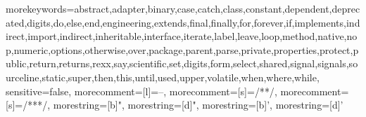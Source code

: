 {morekeywords={abstract,adapter,binary,case,catch,class,constant,dependent,deprecated,digits,do,else,end,engineering,extends,final,finally,for,forever,if,implements,indirect,import,indirect,inheritable,interface,iterate,label,leave,loop,method,native,nop,numeric,options,otherwise,over,package,parent,parse,private,properties,protect,public,return,returns,rexx,say,scientific,set,digits,form,select,shared,signal,signals,sourceline,static,super,then,this,until,used,upper,volatile,when,where,while},
sensitive=false,
morecomment=[l]={--},
morecomment=[s]={/*}{*/},
morecomment=[s]={/**}{*/},
morestring=[b]",
morestring=[d]",
morestring=[b]',
morestring=[d]'}

\lstset{language=NetRexx,
  alsolanguage=Java,
  alsolanguage=Rexx,
  basicstyle=\small,
  stringstyle=\ttfamily}
